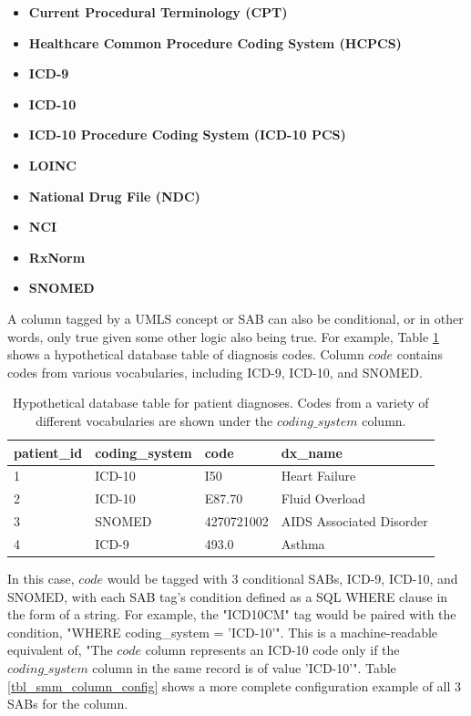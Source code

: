 \documentclass[../main.tex]{subfiles}
\begin{document}
\begin{itemize}
    \item \textbf{Current Procedural Terminology (CPT)}
    \item \textbf{Healthcare Common Procedure Coding System (HCPCS)}
    \item \textbf{ICD-9}
    \item \textbf{ICD-10}
    \item \textbf{ICD-10 Procedure Coding System (ICD-10 PCS)}
    \item \textbf{LOINC}
    \item \textbf{National Drug File (NDC)}
    \item \textbf{NCI}
    \item \textbf{RxNorm}
    \item \textbf{SNOMED}
\end{itemize}

A column tagged by a UMLS concept or SAB can also be conditional, or in other words, only true given some other logic also being true. For example, Table \ref{tbl_smm_example_data} shows a hypothetical database table of diagnosis codes. Column $code$ contains codes from various vocabularies, including ICD-9, ICD-10, and SNOMED.

\def\arraystretch{0.8}
\begin{table}[h!]
\centering
\begin{tabular}{l l l l}
 \toprule
 \textbf{patient\_id} & \textbf{coding\_system} & \textbf{code} & \textbf{dx\_name} \\
 \hline
    1 & ICD-10 & I50 & Heart Failure \\
    2 & ICD-10 & E87.70 & Fluid Overload \\
    3 & SNOMED & 4270721002 & AIDS Associated Disorder \\
    4 & ICD-9  & 493.0 & Asthma \\
 \hline
\end{tabular}
\caption{Hypothetical database table for patient diagnoses. Codes from a variety of different vocabularies are shown under the $coding\_system$ column.}
\label{tbl_smm_example_data}
\end{table}

In this case, $code$ would be tagged with 3 conditional SABs, ICD-9, ICD-10, and SNOMED, with each SAB tag's condition defined as a SQL WHERE clause in the form of a string. For example, the "ICD10CM" tag would be paired with the condition, "WHERE coding\_system = 'ICD-10'". This is a machine-readable equivalent of, "The $code$ column represents an ICD-10 code only if the $coding\_system$ column in the same record is of value 'ICD-10'". Table \ref{tbl_smm_column_config} shows a more complete configuration example of all 3 SABs for the column.
\end{document}
